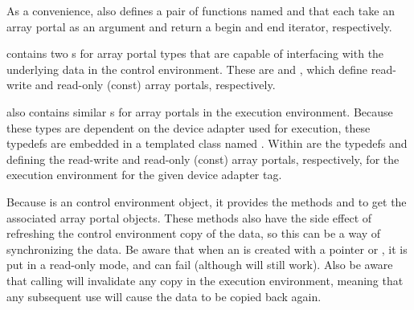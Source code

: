 
As a convenience,  also
defines a pair of functions named 
 and 
 that each take an array portal as an
argument and return a begin and end iterator, respectively.


 contains two s for array portal
types that are capable of interfacing with the underlying data in the
control environment. These are 
 and ,
 which define read-write and read-only (const)
array portals, respectively.

 also contains similar s for array
portals in the execution environment. Because these types are dependent on
the device adapter used for execution, these typedefs are embedded in a
templated class named . 
Within  are the typedefs  and
 defining the read-write and read-only (const) array
portals, respectively, for the execution environment for the given device
adapter tag.

Because  is an control environment object, it
provides the methods  
and   to get
the associated array portal objects. These methods also have the side
effect of refreshing the control environment copy of the data, so this can
be a way of synchronizing the data. Be aware that when an
 is created with a pointer or ,
it is put in a read-only mode, and  can fail
(although  will still work). Also be aware
that calling  will invalidate any copy in the
execution environment, meaning that any subsequent use will cause the data
to be copied back again.


